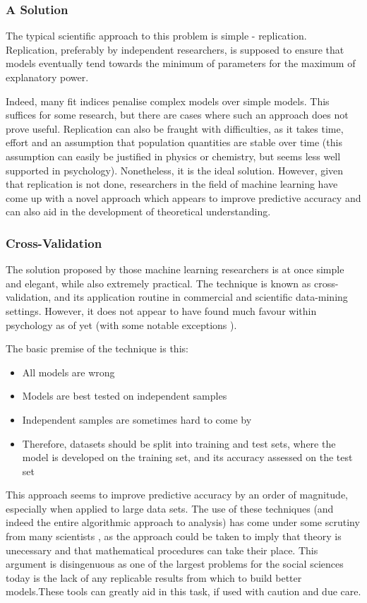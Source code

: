 \subsubsection{A Solution}

The typical scientific approach to this problem is simple - replication. Replication, preferably by independent researchers, is supposed to ensure that models eventually tend towards the minimum of parameters for the maximum of explanatory power. 

Indeed, many fit indices penalise complex models over simple models. This suffices for some research, but there are cases where such an approach does not prove useful. Replication can also be fraught with difficulties, as it takes time, effort and an assumption that population quantities are stable over time (this assumption can easily be justified in physics or chemistry, but seems less well supported in psychology). Nonetheless, it is the ideal solution. However, given that replication is not done, researchers in the field of machine learning have come up with a novel approach which appears to improve predictive accuracy and can also aid in the development of theoretical understanding. 

\subsubsection{Cross-Validation}

The solution proposed by those machine learning researchers is at once simple and elegant, while also extremely practical. The technique is known as cross-validation, and its application routine in commercial and scientific data-mining settings. However, it does not appear to have found much favour within psychology as of yet (with some notable exceptions \cite{dawes1979robust}).  

The basic premise of the technique is this:
\begin{itemize}
\item All models are wrong
\item Models are best tested on independent samples
\item Independent samples are sometimes hard to come by
\item Therefore, datasets should be split into training and test sets, where the model is developed on the training set, and its accuracy assessed on the test set
\end{itemize}

This approach seems to improve predictive accuracy by an order of magnitude, especially when applied to large data sets. The use of these techniques (and indeed the entire algorithmic approach to analysis) has come under some scrutiny from many scientists \cite{breiman2001statistical}, as the approach could be taken to imply that theory is unecessary and that mathematical procedures can take their place. This argument is disingenuous as one of the largest problems for the social sciences today is the lack of any replicable results from which to build better models.These tools can greatly aid in this task, if used with caution and due care\cite{friedman2009elements}. 

